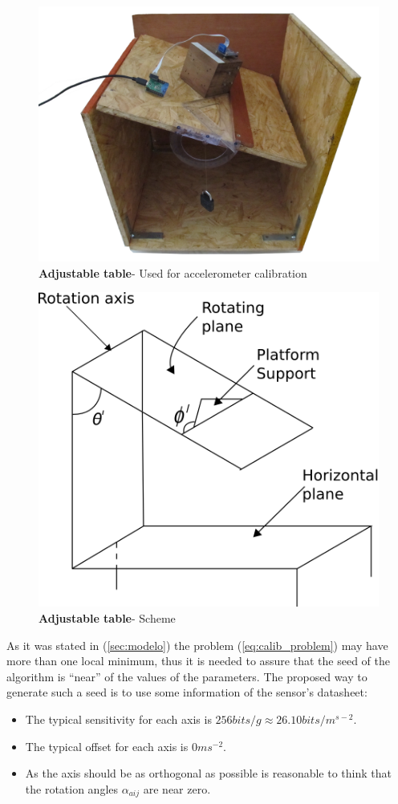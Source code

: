 \documentclass[conference]{IEEEtran}
\newcommand{\refp}[1]{(\ref{#1})}
\begin{document}
\begin{figure}
	\centering
	\includegraphics[width=.6\columnwidth]{./pics_paper/mesa.jpg}
	\caption{\textbf{Adjustable table}- Used for accelerometer calibration}
	\label{fig:mesa}
\end{figure}

\begin{figure}
	\centering
	\includegraphics[width=.6\columnwidth]{./pics_paper/mesa_esquema.png}
	\caption{\textbf{Adjustable table}- Scheme}
	\label{fig:mesa_esquema}
\end{figure}

As it was stated in \refp{sec:modelo} the problem \refp{eq:calib_problem} may have more than one local minimum, thus it is needed to assure that the seed of the algorithm is ``near'' of the values of the parameters. The proposed way to generate such a seed is to use some information of the sensor's datasheet\cite{bib:acc_data}: 

\begin{itemize}
\item The typical sensitivity for each axis is $256 bits/g \approx 26.10 bits / m^{s-2}$.
\item The typical offset for each axis is $0 ms^{-2}$.
\item As the axis should be as orthogonal as possible is reasonable to think that the rotation angles $\alpha_{aij}$ are near zero. 
\end{itemize}
\end{document}
